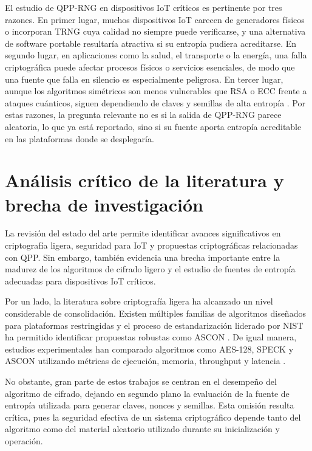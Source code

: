 El estudio de QPP-RNG en dispositivos IoT críticos es pertinente por tres razones. En primer lugar, muchos dispositivos IoT carecen de generadores físicos o incorporan TRNG cuya calidad no siempre puede verificarse, y una alternativa de software portable resultaría atractiva si su entropía pudiera acreditarse. En segundo lugar, en aplicaciones como la salud, el transporte o la energía, una falla criptográfica puede afectar procesos físicos o servicios esenciales, de modo que una fuente que falla en silencio es especialmente peligrosa. En tercer lugar, aunque los algoritmos simétricos son menos vulnerables que RSA o ECC frente a ataques cuánticos, siguen dependiendo de claves y semillas de alta entropía \cite{Grover1996ASearch,Turan2018RecommendationGeneration}. Por estas razones, la pregunta relevante no es si la salida de QPP-RNG parece aleatoria, lo que ya está reportado, sino si su fuente aporta entropía acreditable en las plataformas donde se desplegaría.


\section{Análisis crítico de la literatura y brecha de investigación}

La revisión del estado del arte permite identificar avances significativos en criptografía ligera, seguridad para IoT y propuestas criptográficas relacionadas con QPP. Sin embargo, también evidencia una brecha importante entre la madurez de los algoritmos de cifrado ligero y el estudio de fuentes de entropía adecuadas para dispositivos IoT críticos.

Por un lado, la literatura sobre criptografía ligera ha alcanzado un nivel considerable de consolidación. Existen múltiples familias de algoritmos diseñados para plataformas restringidas y el proceso de estandarización liderado por NIST ha permitido identificar propuestas robustas como ASCON \cite{NationalInstituteofStandards2023AnnouncingSelection,McKay2017ReportCryptography}. De igual manera, estudios experimentales han comparado algoritmos como AES-128, SPECK y ASCON utilizando métricas de ejecución, memoria, throughput y latencia \cite{Radhakrishnan2024EfficiencyDevices,Thakor2021LightweightOpportunities}.

No obstante, gran parte de estos trabajos se centran en el desempeño del algoritmo de cifrado, dejando en segundo plano la evaluación de la fuente de entropía utilizada para generar claves, nonces y semillas. Esta omisión resulta crítica, pues la seguridad efectiva de un sistema criptográfico depende tanto del algoritmo como del material aleatorio utilizado durante su inicialización y operación.

